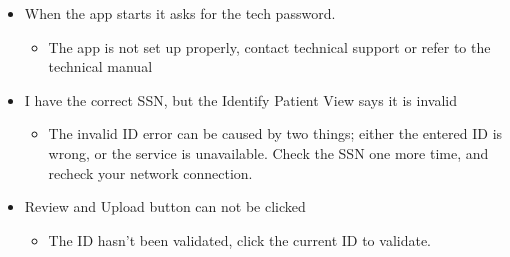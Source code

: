 \begin{itemize}
\item When the app starts it asks for the tech password.
    \begin{itemize}
	\item The app is not set up properly, contact technical support or refer to the technical manual
	\end{itemize}

\item I have the correct SSN, but the Identify Patient View says it is invalid
    \begin{itemize}
    \item The invalid ID error can be caused by two things; either the entered ID is wrong, or the service is unavailable. Check the SSN one more time, and recheck your network connection.
    \end{itemize}

\item Review and Upload button can not be clicked
    \begin{itemize}
	\item The ID hasn't been validated, click the current ID to validate.
	\end{itemize}
    
\end{itemize}